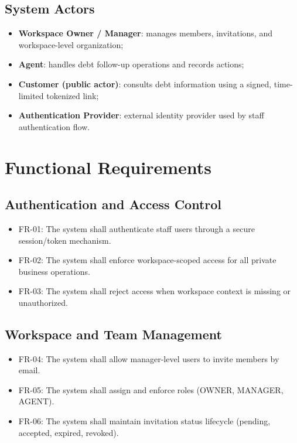 \subsection{System Actors}
\begin{itemize}
  \item \textbf{Workspace Owner / Manager}: manages members, invitations, and workspace-level organization;
  \item \textbf{Agent}: handles debt follow-up operations and records actions;
  \item \textbf{Customer (public actor)}: consults debt information using a signed, time-limited tokenized link;
  \item \textbf{Authentication Provider}: external identity provider used by staff authentication flow.
\end{itemize}

\section{Functional Requirements}
\subsection{Authentication and Access Control}
\begin{itemize}
  \item FR-01: The system shall authenticate staff users through a secure session/token mechanism.
  \item FR-02: The system shall enforce workspace-scoped access for all private business operations.
  \item FR-03: The system shall reject access when workspace context is missing or unauthorized.
\end{itemize}

\subsection{Workspace and Team Management}
\begin{itemize}
  \item FR-04: The system shall allow manager-level users to invite members by email.
  \item FR-05: The system shall assign and enforce roles (OWNER, MANAGER, AGENT).
  \item FR-06: The system shall maintain invitation status lifecycle (pending, accepted, expired, revoked).
\end{itemize}

